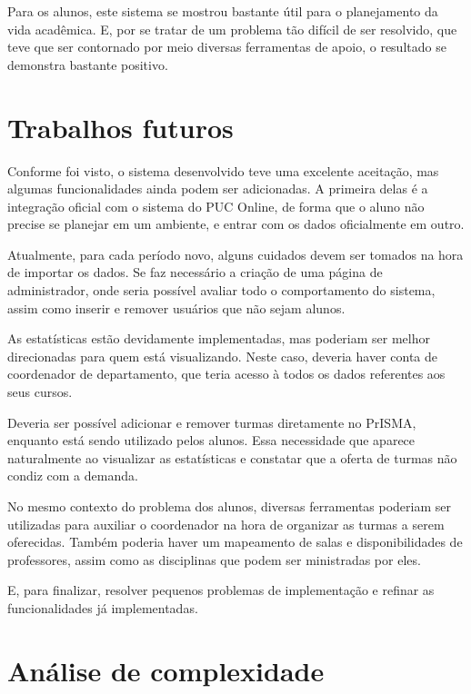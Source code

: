 \documentclass[graduacao,brazil]{ThesisPUC}
\begin{document}
Para os alunos, este sistema se mostrou bastante útil para o planejamento da vida acadêmica. E, por se tratar de um problema tão difícil de ser resolvido, que teve que ser contornado por meio diversas ferramentas de apoio, o resultado se demonstra bastante positivo.


\chapter{Trabalhos futuros}

Conforme foi visto, o sistema desenvolvido teve uma excelente aceitação, mas algumas funcionalidades ainda podem ser adicionadas. A primeira delas é a integração oficial com o sistema do PUC Online, de forma que o aluno não precise se planejar em um ambiente, e entrar com os dados oficialmente em outro.

Atualmente, para cada período novo, alguns cuidados devem ser tomados na hora de importar os dados. Se faz necessário a criação de uma página de administrador, onde seria possível avaliar todo o comportamento do sistema, assim como inserir e remover usuários que não sejam alunos.

As estatísticas estão devidamente implementadas, mas poderiam ser melhor direcionadas para quem está visualizando. Neste caso, deveria haver conta de coordenador de departamento, que teria acesso à todos os dados referentes aos seus cursos.

Deveria ser possível adicionar e remover turmas diretamente no PrISMA, enquanto está sendo utilizado pelos alunos. Essa necessidade que aparece naturalmente ao visualizar as estatísticas e constatar que a oferta de turmas não condiz com a demanda.

No mesmo contexto do problema dos alunos, diversas ferramentas poderiam ser utilizadas para auxiliar o coordenador na hora de organizar as turmas a serem oferecidas. Também poderia haver um mapeamento de salas e disponibilidades de professores, assim como as disciplinas que podem ser ministradas por eles.

E, para finalizar, resolver pequenos problemas de implementação e refinar as funcionalidades já implementadas.

\arial
\nocite{*}


\normalfont

\appendix
\chapter{Análise de complexidade}
\end{document}
